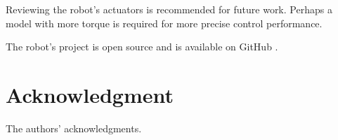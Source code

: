 \documentclass[conference]{IEEEtran}
\begin{document}
Reviewing the robot's actuators is recommended for future work. Perhaps a model with more torque is required for more precise control performance.

The robot's project is open source and is available on GitHub \cite{CaramelRepo}.

\section*{Acknowledgment}

The authors' acknowledgments.





\end{document}
